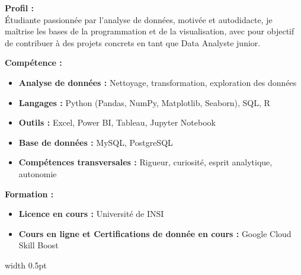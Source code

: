 \documentclass[a4paper,12pt]{article}
\renewcommand\labelitemi{$\bullet$}
\begin{document}
\textbf{Profil :} \\[0.3cm]
Étudiante passionnée par l’analyse de données, motivée et autodidacte, je maîtrise les bases de la programmation et de la visualisation, avec pour objectif de contribuer à des projets concrets en tant que Data Analyste junior.\\[0.4cm]
\begin{minipage}{0.45\textwidth}
    \raggedright
\textbf{Compétence :} \\
\begin{itemize}
    \renewcommand\labelitemi{$\bullet$} %
    \item{ \textbf{Analyse de données : }Nettoyage, transformation, exploration des données}
    \item{ \textbf{Langages : }Python (Pandas, NumPy, Matplotlib, Seaborn), SQL, R}
    \item{ \textbf{Outils : }Excel, Power BI, Tableau, Jupyter Notebook}
    \item{ \textbf{Base de données : }MySQL, PostgreSQL}
    \item{ \textbf{Compétences transversales : }Rigueur, curiosité, esprit analytique, autonomie}
\end{itemize}
\vspace{0.3cm}
\textbf{Formation :} \\
\begin{itemize}
    \renewcommand\labelitemi{$\bullet$} %
        \item{ \textbf{Licence en cours : }Université de INSI
        }
        \item{ \textbf{Cours en ligne et Certifications de donnée en cours : }Google Cloud Skill Boost
        }
\end{itemize}
\end{minipage}
\hfill
\vrule width 0.5pt %
\hfill
\end{document}
